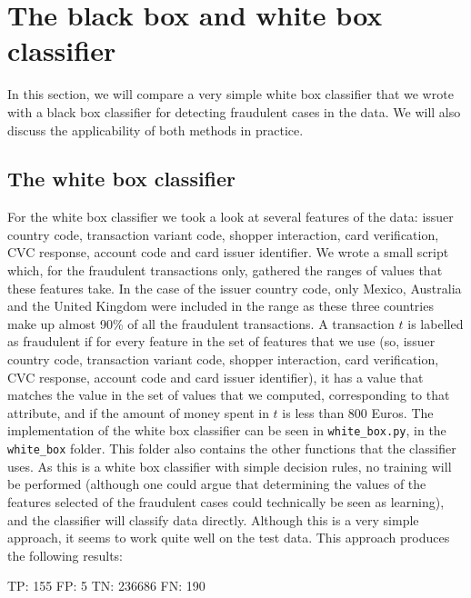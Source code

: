 \documentclass[]{article}
\begin{document}
\section{The black box and white box classifier}
In this section, we will compare a very simple white box classifier that we wrote with a black box classifier for detecting fraudulent cases in the data. We will also discuss the applicability of both methods in practice.
\subsection{The white box classifier}
For the white box classifier we took a look at several features of the data: issuer country code, transaction variant code, shopper interaction, card verification, CVC response, account code and card issuer identifier. We wrote a small script which, for the fraudulent transactions only, gathered the ranges of values that these features take. In the case of the issuer country code, only Mexico, Australia and the United Kingdom were included in the range as these three countries make up almost 90\% of all the fraudulent transactions. A transaction $t$ is labelled as fraudulent if for every feature in the set of features that we use (so, issuer country code, transaction variant code, shopper interaction, card verification, CVC response, account code and card issuer identifier), it has a value that matches the value in the set of values that we computed, corresponding to that attribute, and if the amount of money spent in $t$ is less than 800 Euros. The implementation of the white box classifier can be seen in \texttt{white\_box.py}, in the \texttt{white\_box} folder. This folder also contains the other functions that the classifier uses. As this is a white box classifier with simple decision rules, no training will be performed (although one could argue that determining the values of the features selected of the fraudulent cases could technically be seen as learning), and the classifier will classify data directly. Although this is a very simple approach, it seems to work quite well on the test data. This approach produces the following results:

\begin{flushleft}
TP: 155 \newline
FP: 5  \newline
TN: 236686 \newline
FN: 190 \newline
\end{flushleft}
\end{document}
